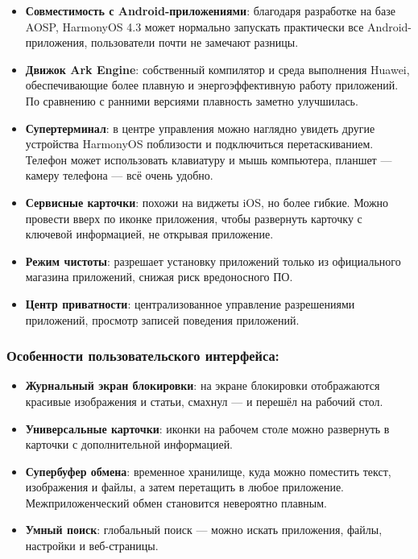 \begin{itemize}
  \item \textbf{Совместимость с Android-приложениями}: благодаря разработке на базе AOSP, HarmonyOS 4.3 может нормально запускать практически все Android-приложения, пользователи почти не замечают разницы.
  \item \textbf{Движок Ark Engine}: собственный компилятор и среда выполнения Huawei, обеспечивающие более плавную и энергоэффективную работу приложений. По сравнению с ранними версиями плавность заметно улучшилась.
  \item \textbf{Супертерминал}: в центре управления можно наглядно увидеть другие устройства HarmonyOS поблизости и подключиться перетаскиванием. Телефон может использовать клавиатуру и мышь компьютера, планшет — камеру телефона — всё очень удобно.
  \item \textbf{Сервисные карточки}: похожи на виджеты iOS, но более гибкие. Можно провести вверх по иконке приложения, чтобы развернуть карточку с ключевой информацией, не открывая приложение.
  \item \textbf{Режим чистоты}: разрешает установку приложений только из официального магазина приложений, снижая риск вредоносного ПО.
  \item \textbf{Центр приватности}: централизованное управление разрешениями приложений, просмотр записей поведения приложений.
\end{itemize}

\subsubsection*{Особенности пользовательского интерфейса:}

\begin{itemize}
  \item \textbf{Журнальный экран блокировки}: на экране блокировки отображаются красивые изображения и статьи, смахнул — и перешёл на рабочий стол.
  \item \textbf{Универсальные карточки}: иконки на рабочем столе можно развернуть в карточки с дополнительной информацией.
  \item \textbf{Супербуфер обмена}: временное хранилище, куда можно поместить текст, изображения и файлы, а затем перетащить в любое приложение. Межприложенческий обмен становится невероятно плавным.
  \item \textbf{Умный поиск}: глобальный поиск — можно искать приложения, файлы, настройки и веб-страницы.
\end{itemize}

